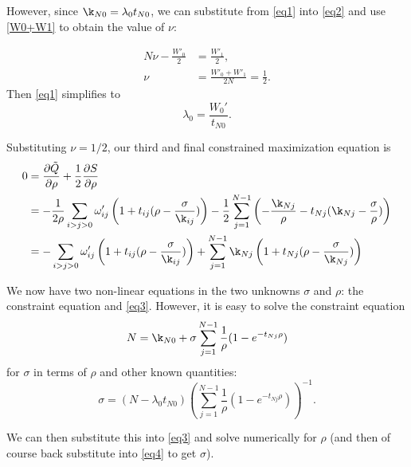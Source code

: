 \documentclass[12pt,leqno]{article}
\begin{document}
However, since $\k_{N0} = \lambda_0t_{N0}$, we can substitute
from \eqref{eq1} into \eqref{eq2} and use \eqref{W0+W1}
to obtain the value of $\nu$:

\begin{equation}\label{nu}
  \begin{split}
N\nu - \frac{W'_0}{2} &= \frac{W'_1}{2},\\ 
\nu &= \frac{W'_0+W'_1}{2N} = \frac{1}{2}.
  \end{split}
\end{equation}
Then \eqref{eq1} simplifies to
\begin{equation} \label{lambda0:1}
    \lambda_0 = \frac{W_0'}{t_{N0}}.
\end{equation}

Substituting $\nu =1/2$, our third and final constrained maximization equation is
\begin{equation}\label{eq3}
  \begin{split}
  0 &= \frac{\partial\tilde{Q}}{\partial\rho} + \frac{1}{2}\frac{\partial{S}}{\partial\rho} \\
  &= -\frac{1}{2\rho}\sum_{i>j>0}\omega'_{ij}\left(1 + t_{ij}(\rho - \frac{\sigma}{\k_{ij}})\right) -\frac{1}{2}\sum_{j=1}^{N-1}\left(-\frac{\k_{Nj}}{\rho} -t_{Nj}(\k_{Nj} - \frac{\sigma}{\rho})\right)\\
  &= -\sum_{i>j>0}\omega'_{ij}\left(1 + t_{ij}(\rho - \frac{\sigma}{\k_{ij}})\right) +\sum_{j=1}^{N-1}\k_{Nj}\left(1 + t_{Nj}(\rho - \frac{\sigma}{\k_{Nj}})\right)
  \end{split}
\end{equation}

We now have two non-linear equations in the two unknowns $\sigma$ and $\rho$: the constraint equation and \eqref{eq3}.  However, it is easy to solve
the constraint equation 
$$
N =\k_{N0} + \sigma\sum_{j=1}^{N-1}\frac{1}{\rho}(1-e^{-t_{Nj}\rho})\\
$$
for $\sigma$ in terms of $\rho$ and other
known quantities:
\begin{equation}\label{eq4}
  \sigma = (N - \lambda_0t_{N0})\left(\sum_{j=1}^{N-1}\frac{1}{\rho}(1-e^{-t_{Nj}\rho})\right)^{-1}.
\end{equation}

We can then substitute this into \eqref{eq3} and solve numerically
for $\rho$ (and then of course back substitute into \eqref{eq4} to get $\sigma$).

\end{document}
